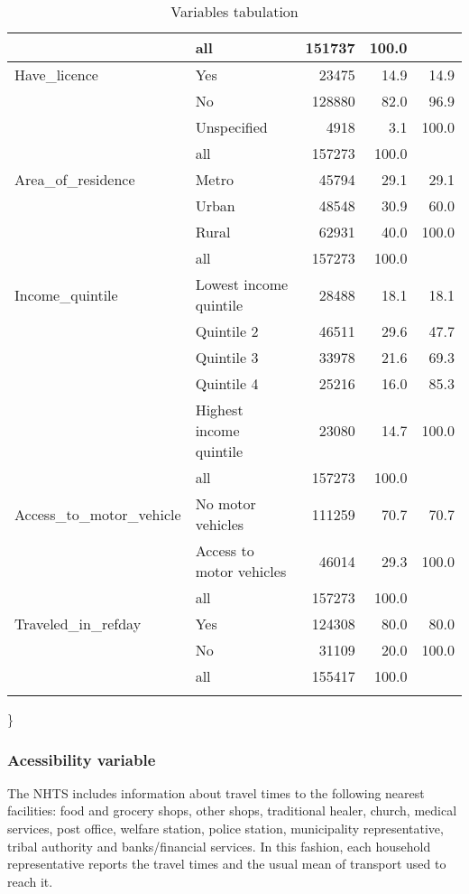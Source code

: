 \documentclass[]{article}
\begin{document}
\begin{longtable}{llrrr}
   \hline
 & all & 151737 & 100.0 &  \\ 
   \hline
\hline
Have\_licence & Yes & 23475 & 14.9 & 14.9 \\ 
   & No & 128880 & 82.0 & 96.9 \\ 
   & Unspecified & 4918 & 3.1 & 100.0 \\ 
   \hline
 & all & 157273 & 100.0 &  \\ 
   \hline
\hline
Area\_of\_residence & Metro & 45794 & 29.1 & 29.1 \\ 
   & Urban & 48548 & 30.9 & 60.0 \\ 
   & Rural & 62931 & 40.0 & 100.0 \\ 
   \hline
 & all & 157273 & 100.0 &  \\ 
   \hline
\hline
Income\_quintile & Lowest income quintile & 28488 & 18.1 & 18.1 \\ 
   & Quintile 2 & 46511 & 29.6 & 47.7 \\ 
   & Quintile 3 & 33978 & 21.6 & 69.3 \\ 
   & Quintile 4 & 25216 & 16.0 & 85.3 \\ 
   & Highest income quintile & 23080 & 14.7 & 100.0 \\ 
   \hline
 & all & 157273 & 100.0 &  \\ 
   \hline
\hline
Access\_to\_motor\_vehicle & No motor vehicles & 111259 & 70.7 & 70.7 \\ 
   & Access to motor vehicles & 46014 & 29.3 & 100.0 \\ 
   \hline
 & all & 157273 & 100.0 &  \\ 
   \hline
\hline
Traveled\_in\_refday & Yes & 124308 & 80.0 & 80.0 \\ 
   & No & 31109 & 20.0 & 100.0 \\ 
   \hline
 & all & 155417 & 100.0 &  \\ 
   \hline
\hline
\hline
\caption{Variables tabulation} 
\label{tab: nominal1}
\end{longtable}

\}

\subsubsection{Acessibility variable}\label{acessibility-variable}

The NHTS includes information about travel times to the following
nearest facilities: food and grocery shops, other shops, traditional
healer, church, medical services, post office, welfare station, police
station, municipality representative, tribal authority and
banks/financial services. In this fashion, each household representative
reports the travel times and the usual mean of transport used to reach
it.
\end{document}

